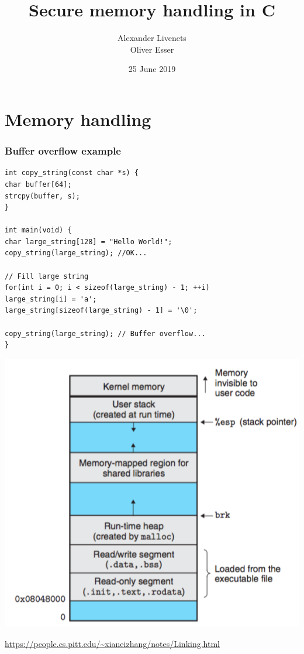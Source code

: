 \documentclass[usenames,dvipsnames]{beamer}
\title{Secure memory handling in C}
\subtitle{}
\author{Alexander Livenets\\Oliver Esser}
\institute{}
\date{25 June 2019}
\begin{document}


\begin{frame}
\titlepage
\end{frame}

\section{Memory handling}
\begin{frame}[fragile]
\frametitle{Buffer overflow example}
\tiny
\begin{verbatim}
int copy_string(const char *s) {
char buffer[64];
strcpy(buffer, s);
}

int main(void) {
char large_string[128] = "Hello World!";
copy_string(large_string); //OK...

// Fill large string
for(int i = 0; i < sizeof(large_string) - 1; ++i)
large_string[i] = 'a';
large_string[sizeof(large_string) - 1] = '\0';

copy_string(large_string); // Buffer overflow...
}
\end{verbatim}
\end{frame}

\begin{frame}
\centering
\includegraphics[scale=0.35]{linux_mem.png}

\tiny{\url{https://people.cs.pitt.edu/~xianeizhang/notes/Linking.html}}
\end{frame}
\end{document}
